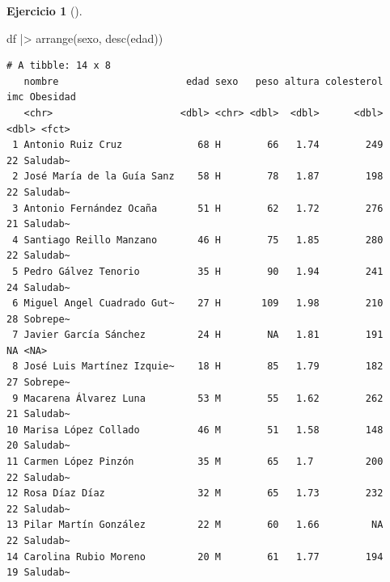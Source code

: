 \documentclass[
  a4paper,
]{scrreport}
\newenvironment{Shaded}{\begin{snugshade}}{\end{snugshade}}
\newcommand{\FunctionTok}[1]{\textcolor[rgb]{0.28,0.35,0.67}{#1}}
\newcommand{\NormalTok}[1]{\textcolor[rgb]{0.00,0.23,0.31}{#1}}
\newcommand{\SpecialCharTok}[1]{\textcolor[rgb]{0.37,0.37,0.37}{#1}}
\theoremstyle{definition}
\newtheorem{exercise}{Ejercicio}[chapter]
\theoremstyle{remark}
\begin{document}
\begin{exercise}[]
\begin{enumerate}
  \begin{tcolorbox}[enhanced jigsaw, toprule=.15mm, rightrule=.15mm, arc=.35mm, colback=white, colbacktitle=quarto-callout-tip-color!10!white, toptitle=1mm, left=2mm, colframe=quarto-callout-tip-color-frame, opacityback=0, breakable, opacitybacktitle=0.6, bottomtitle=1mm, titlerule=0mm, title=\textcolor{quarto-callout-tip-color}{\faLightbulb}\hspace{0.5em}{Solución}, bottomrule=.15mm, coltitle=black, leftrule=.75mm]

\begin{Shaded}
\begin{Highlighting}[]
\NormalTok{df }\SpecialCharTok{|\textgreater{}}
    \FunctionTok{arrange}\NormalTok{(sexo, }\FunctionTok{desc}\NormalTok{(edad))}
\end{Highlighting}
\end{Shaded}

\begin{verbatim}
# A tibble: 14 x 8
   nombre                      edad sexo   peso altura colesterol   imc Obesidad
   <chr>                      <dbl> <chr> <dbl>  <dbl>      <dbl> <dbl> <fct>   
 1 Antonio Ruiz Cruz             68 H        66   1.74        249    22 Saludab~
 2 José María de la Guía Sanz    58 H        78   1.87        198    22 Saludab~
 3 Antonio Fernández Ocaña       51 H        62   1.72        276    21 Saludab~
 4 Santiago Reillo Manzano       46 H        75   1.85        280    22 Saludab~
 5 Pedro Gálvez Tenorio          35 H        90   1.94        241    24 Saludab~
 6 Miguel Angel Cuadrado Gut~    27 H       109   1.98        210    28 Sobrepe~
 7 Javier García Sánchez         24 H        NA   1.81        191    NA <NA>    
 8 José Luis Martínez Izquie~    18 H        85   1.79        182    27 Sobrepe~
 9 Macarena Álvarez Luna         53 M        55   1.62        262    21 Saludab~
10 Marisa López Collado          46 M        51   1.58        148    20 Saludab~
11 Carmen López Pinzón           35 M        65   1.7         200    22 Saludab~
12 Rosa Díaz Díaz                32 M        65   1.73        232    22 Saludab~
13 Pilar Martín González         22 M        60   1.66         NA    22 Saludab~
14 Carolina Rubio Moreno         20 M        61   1.77        194    19 Saludab~
\end{verbatim}

  \end{tcolorbox}
\end{enumerate}

\end{exercise}
\end{document}

